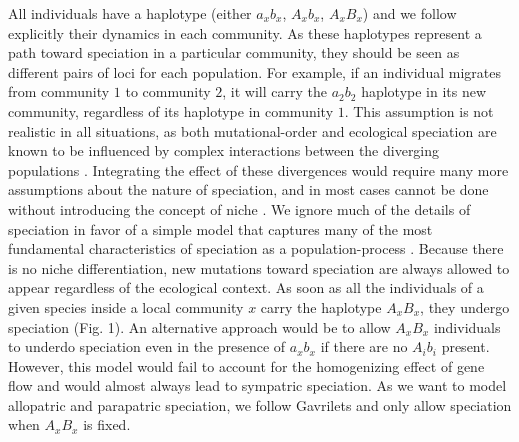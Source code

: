\documentclass[letterpaper,twocolumn,superscriptaddress,showkeys]{revtex4}
\begin{document}
All individuals have a haplotype (either $a_xb_x$, $A_xb_x$, $A_xB_x$) and we follow explicitly their dynamics in each community. As these haplotypes represent a path toward speciation in a particular community, they should be seen as different pairs of loci for each population. For example, if an individual migrates from community $1$ to community $2$, it will carry the $a_2b_2$ haplotype in its new community, regardless of its haplotype in community $1$. This assumption is not realistic in all situations, as both mutational-order and ecological speciation are known to be influenced by complex interactions between the diverging populations \cite{man90,sch09,nos11,coy04,gav04}. Integrating the effect of these divergences would require many more assumptions about the nature of speciation, and in most cases cannot be done without introducing the concept of niche \cite{sch00}. We ignore much of the details of speciation in favor of a simple model that captures many of the most fundamental characteristics of speciation as a population-process \cite{gav04}. Because there is no niche differentiation, new mutations toward speciation are always allowed to appear regardless of the ecological context. As soon as all the individuals of a given species inside a local community  $x$ carry the haplotype $A_xB_x$, they undergo speciation (Fig. 1). An alternative approach would be to allow $A_xB_x$ individuals to underdo speciation even in the presence of $a_xb_x$ if there are no $A_ib_i$ present. However, this model would fail to account for the homogenizing effect of gene flow and would almost always lead to sympatric speciation. As we want to model allopatric and parapatric speciation, we follow Gavrilets \cite{gav04} and only allow speciation when $A_xB_x$ is fixed.
\end{document}
